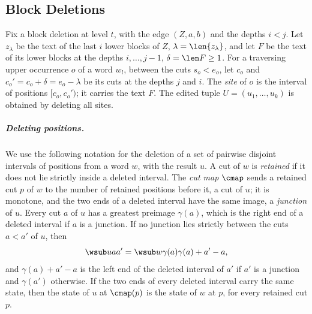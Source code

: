 \subsection{Block Deletions}\label{app:fresh-deletion}

Fix a block deletion at level $t$, with the edge $(Z,a,b)$ and the depths
$i<j$. Let $z_\lambda$ be the text of the last $i$ lower blocks of $Z$,
$\lambda=\len{z_\lambda}$, and let $F$ be the text of its lower blocks at
the depths $i,\dots,j-1$, $\delta=\len F\ge1$. For a traversing upper
occurrence $o$ of a word $w_l$, between the cuts $s_o<e_o$, let $c_o$ and
$c_o'=c_o+\delta=e_o-\lambda$ be its cuts at the depths $j$ and $i$. The
\emph{site} of $o$ is the interval of positions $[c_o,c_o')$; it carries the
text $F$. The edited tuple $U=(u_1,\dots,u_k)$ is obtained by deleting all
sites.

\subparagraph*{Deleting positions.}
We use the following notation for the deletion of a set of pairwise disjoint
intervals of positions from a word $w$, with the result $u$. A cut of $w$ is
\emph{retained} if it does not lie strictly inside a deleted interval. The
\emph{cut map} $\cmap$ sends a retained cut $p$ of $w$ to the number of
retained positions before it, a cut of $u$; it is monotone, and the two ends
of a deleted interval have the same image, a \emph{junction} of $u$. Every
cut $a$ of $u$ has a greatest preimage $\gamma(a)$, which is the right end
of a deleted interval if $a$ is a junction. If no junction lies strictly
between the cuts $a<a'$ of $u$, then
\begin{equation}\label{eq:between-junctions}
  \wsub ua{a'}=\wsub w{\gamma(a)}{\gamma(a)+a'-a},
\end{equation}
and $\gamma(a)+a'-a$ is the left end of the deleted interval of $a'$ if $a'$
is a junction and $\gamma(a')$ otherwise. If the two ends of every deleted
interval carry the same state, then the state of $u$ at $\cmap(p)$ is the
state of $w$ at $p$, for every retained cut $p$.

